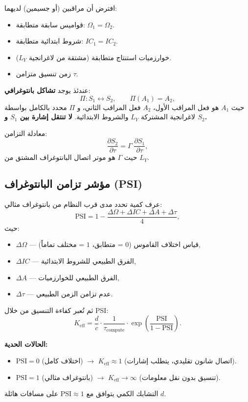 \documentclass[11pt,a4paper]{article}
\begin{document}
	افترض أن مراقبين (أو جسيمين) لديهما:
	\begin{itemize}
		\item قواميس سابقة متطابقة: \(\Omega_1 = \Omega_2\).
		\item شروط ابتدائية متطابقة: \(IC_1 = IC_2\).
		\item خوارزميات استنتاج متطابقة (مشتقة من لاغرانجية \(L_Y\)).
		\item زمن تنسيق متزامن \(\tau\).
	\end{itemize}
	
	عندئذ يوجد \textbf{تشاكل بانتوغرافي}:
	\[
	\Pi: S_1 \leftrightarrow S_2, \qquad \Pi(A_1) = A_2,
	\]
	حيث \(A_1\) هو فعل المراقب الأول، \(A_2\) فعل المراقب الثاني، و \(\Pi\) محدد بالكامل بواسطة لاغرانجية المشتركة \(L_Y\) والشروط الابتدائية. \textbf{لا تنتقل إشارة بين \(S_1\) و \(S_2\).}
	
	معادلة التزامن:
	\[
	\frac{\partial S_2}{\partial \tau} = \Gamma \; \frac{\partial S_1}{\partial \tau},
	\]
	حيث \(\Gamma\) هو موتر اتصال البانتوغراف المشتق من \(L_Y\).
	
	\subsection{مؤشر تزامن البانتوغراف (PSI)}
	
	عرف كمية تحدد مدى قرب النظام من بانتوغراف مثالي:
	\[
	\mathrm{PSI} = 1 - \frac{\Delta\Omega + \Delta IC + \Delta A + \Delta\tau}{4},
	\]
	حيث:
	\begin{itemize}
		\item \(\Delta\Omega\) — قياس اختلاف القاموس (\(0\) = متطابق، \(1\) = مختلف تماماً),
		\item \(\Delta IC\) — الفرق الطبيعي للشروط الابتدائية,
		\item \(\Delta A\) — الفرق الطبيعي للخوارزميات,
		\item \(\Delta\tau\) — عدم تزامن الزمن الطبيعي.
	\end{itemize}
	
	ثم تُعبر كفاءة التنسيق من خلال PSI:
	\[
	K_{\mathrm{eff}} = \frac{d}{c} \cdot \frac{1}{\tau_{\mathrm{compute}}} \cdot \exp\!\left( \frac{\mathrm{PSI}}{1 - \mathrm{PSI}} \right).
	\]
	
	\textbf{الحالات الحدية:}
	\begin{itemize}
		\item \(\mathrm{PSI} = 0\) (اختلاف كامل) \(\to\) \(K_{\mathrm{eff}} \approx 1\) (اتصال شانون تقليدي، يتطلب إشارات).
		\item \(\mathrm{PSI} = 1\) (بانتوغراف مثالي) \(\to\) \(K_{\mathrm{eff}} \to \infty\) (تنسيق بدون نقل معلومات).
	\end{itemize}
	التشابك الكمي يتوافق مع \(\mathrm{PSI} \approx 1\) على مسافات هائلة \(d\).
	
\end{document}
